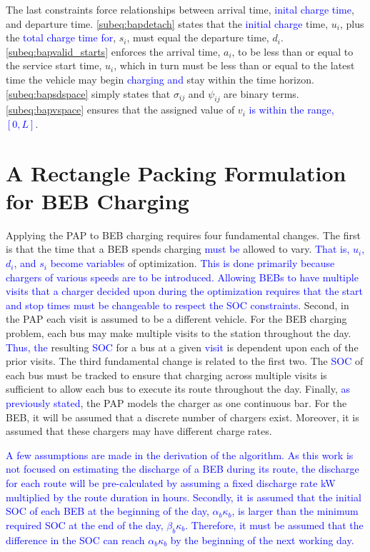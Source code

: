 \documentclass[utf8]{FrontiersinHarvard}
\begin{document}
The last constraints force relationships between arrival time, \textcolor{blue}{inital charge time}, and
departure time. \autoref{subeq:bapdetach} states that the \textcolor{blue}{ initial charge} time, \(u_i\), plus
the \textcolor{blue}{total charge time for}, \(s_i\), must equal the departure time, \(d_i\).
\autoref{subeq:bapvalid_starts} enforces the arrival time, \(a_i\), to be less than or equal to the service start time,
\(u_i\), which in turn must be less than or equal to the latest time the vehicle may begin
\textcolor{blue}{charging and} stay within the time horizon. \autoref{subeq:bapsdspace} simply states that
\(\sigma_{ij}\) and \(\psi_{ij}\) are binary terms. \autoref{subeq:bapvspace} ensures that the assigned value of \(v_i\)
\textcolor{blue}{is within the range, $[0,L]$}.
\section{A Rectangle Packing Formulation for BEB Charging}
\label{sec:problemformulation}
Applying the PAP to BEB charging requires four fundamental changes. The first is that the time that a BEB spends
charging \textcolor{blue}{must be} allowed to vary. \textcolor{blue}{That is, $u_i$, $d_i$, and $s_i$ become variables} of optimization. \textcolor{blue}{This is done primarily because chargers of various speeds are to be introduced. Allowing BEBs to have multiple visits that a charger decided upon during the optimization requires that the start and stop times must be changeable to respect the SOC constraints.} Second, in the PAP each
visit is assumed to be a different vehicle. For the BEB charging problem, each bus may make multiple visits to the
station throughout the day\textcolor{blue}{. Thus, the} resulting \textcolor{blue}{SOC} for a bus at a given
\textcolor{blue}{visit} is dependent upon each of the prior visits. The third fundamental change is related
to the first two. The \textcolor{blue}{SOC} of each bus must be tracked to ensure that charging across
multiple visits is sufficient to allow each bus to execute its route throughout the day. Finally,
\textcolor{blue}{as previously stated}, the PAP models the charger as one continuous bar. For the BEB, it
will be assumed that a discrete number of chargers exist. Moreover, it is assumed that these chargers may have different
charge rates.

\textcolor{blue}{A few assumptions are made in the derivation of the algorithm. As this work is not focused on
  estimating the discharge of a BEB during its route, the discharge for each route will be pre-calculated by assuming a
  fixed discharge rate kW multiplied by the route duration in hours. Secondly, it is assumed that the initial SOC of
  each BEB at the beginning of the day, $\alpha_b\kappa_b$, is larger than the minimum required SOC at the end of the
  day, $\beta_b\kappa_b$. Therefore, it must be assumed that the difference in the SOC can reach $\alpha_b\kappa_b$ by
  the beginning of the next working day.}
\end{document}
